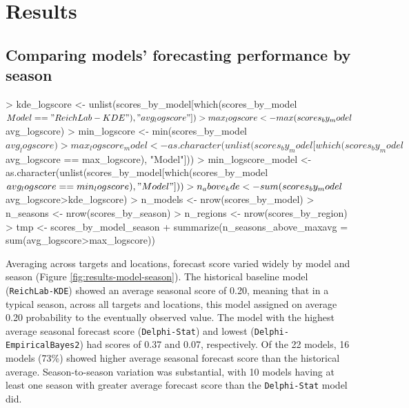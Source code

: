\documentclass{article}
\begin{document}
\section{Results}

\subsection{Comparing models' forecasting performance by season}
\begin{Schunk}
\begin{Sinput}
> kde_logscore <- unlist(scores_by_model[which(scores_by_model$Model=="ReichLab-KDE"), "avg_logscore"])
> max_logscore <- max(scores_by_model$avg_logscore)
> min_logscore <- min(scores_by_model$avg_logscore)
> max_logscore_model <- as.character(unlist(scores_by_model[which(scores_by_model$avg_logscore == max_logscore), "Model"]))
> min_logscore_model <- as.character(unlist(scores_by_model[which(scores_by_model$avg_logscore == min_logscore), "Model"]))
> n_above_kde <- sum(scores_by_model$avg_logscore>kde_logscore)
> n_models <- nrow(scores_by_model)
> n_seasons <- nrow(scores_by_season)
> n_regions <- nrow(scores_by_region)
> tmp <- scores_by_model_season %
+     summarize(n_seasons_above_maxavg = sum(avg_logscore>max_logscore)) 
\end{Sinput}
\end{Schunk}


Averaging across targets and locations, forecast score varied widely by model and season (Figure \ref{fig:results-model-season}). 
The historical baseline model ({\tt ReichLab-KDE}) showed an average seasonal score of 
0.20, 
meaning that in a typical season, across all targets and locations, this model assigned on average 
0.20 
probability to the eventually observed value. 
The model with the highest average seasonal forecast score 
({\tt Delphi-Stat}) 
and lowest 
({\tt Delphi-EmpiricalBayes2}) 
had scores of 0.37 and 0.07, respectively. 
Of the 22 models, 16 models 
(73\%) 
showed higher average seasonal forecast score than the historical average.
Season-to-season variation was substantial, with 
10 
models having at least one season with greater average forecast score than the 
{\tt Delphi-Stat}
model did.
\end{document}
